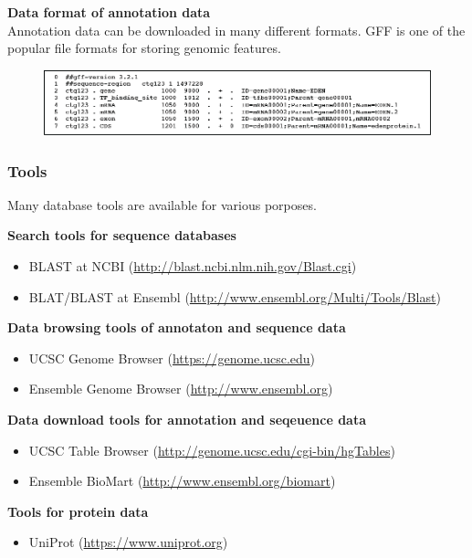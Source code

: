 \noindent
\textbf{Data format of annotation data} \\
Annotation data can be downloaded in many different formats. GFF is one of the popular file formats for storing genomic features.
\begin{figure}[H]
  \centering
      \includegraphics[width=\textwidth]{fig05/gff3.png}
\end{figure}

%
%
\subsubsection*{Tools}
Many database tools are available for various porposes.
 
\noindent
\textbf{Search tools for sequence databases}
\begin{itemize}
\item BLAST at NCBI (\href{http://blast.ncbi.nlm.nih.gov/Blast.cgi}{http://blast.ncbi.nlm.nih.gov/Blast.cgi})
\item BLAT/BLAST at Ensembl (\href{http://www.ensembl.org/Multi/Tools/Blast}{http://www.ensembl.org/Multi/Tools/Blast})
\end{itemize}

\noindent
\textbf{Data browsing tools of annotaton and sequence data}
\begin{itemize}
\item UCSC Genome Browser (\href{https://genome.ucsc.edu}{https://genome.ucsc.edu})
\item Ensemble Genome Browser (\href{http://www.ensembl.org}{http://www.ensembl.org})
\end{itemize}

\noindent
\textbf{Data download tools for annotation and seqeuence data}
\begin{itemize}
\item UCSC Table Browser (\href{http://genome.ucsc.edu/cgi-bin/hgTables}{http://genome.ucsc.edu/cgi-bin/hgTables})
\item Ensemble BioMart (\href{http://www.ensembl.org/biomart}{http://www.ensembl.org/biomart})
\end{itemize}

\noindent
\textbf{Tools for protein data}
\begin{itemize}
\item UniProt (\href{https://www.uniprot.org}{https://www.uniprot.org})
\end{itemize}

\bigskip 

%
